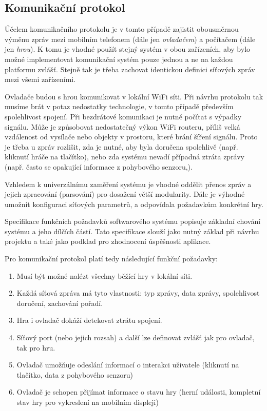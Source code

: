 \documentclass[thesis=B,czech,hidelinks]{FITthesis}[2012/06/26] %
\begin{document}
\subsection{Komunikační protokol}

Účelem komunikačního protokolu je v tomto případě zajistit obousměrnou výměnu zpráv mezi mobilním telefonem (dále jen \textit{ovladačem}) a počítačem (dále jen \textit{hrou}). K tomu je vhodné použít stejný systém v obou zařízeních, aby bylo možné implementovat komunikační systém pouze jednou a ne na každou platformu zvlášť. Stejně tak je třeba zachovat identickou definici síťových zpráv mezi všemi zařízeními.

Ovladače budou s hrou komunikovat v lokální WiFi síti. Při návrhu protokolu tak musíme brát v potaz nedostatky technologie, v tomto případě především spolehlivost spojení. Při bezdrátové komunikaci je nutné počítat s výpadky signálu. Může je způsobovat nedostatečný výkon WiFi routeru, příliš velká vzdálenost od vysílače nebo objekty v prostoru, které brání šíření signálu. Proto je třeba u zpráv rozlišit, zda je nutné, aby byla doručena spolehlivě (např. kliknutí hráče na tlačítko), nebo zda systému nevadí případná ztráta zprávy (např. často se opakující informace z pohybového senzoru,). 

Vzhledem k univerzálnímu zaměření systému je vhodné oddělit přenos zpráv a jejich zpracování (parsování) pro dosažení větší modularity. Dále je výhodné umožnit  konfiguraci síťových parametrů, a odpovídala požadavkům konkrétní hry.

Specifikace funkčních požadavků softwarového systému popisuje základní chování systému a jeho dílčích částí. Tato specifikace slouží jako nutný základ při návrhu projektu a také jako podklad pro zhodnocení úspěšnosti aplikace. \cite{pozadavky}

Pro komunikační protokol platí tedy následující funkční požadavky:

\begin{enumerate}
	\item Musí být možné nalézt všechny běžící hry v lokální síti.
	\item Každá síťová zpráva má tyto vlastnosti: typ zprávy, data zprávy, spolehlivost doručení, zachování pořadí.
	\item Hra i ovladač dokáží detekovat ztrátu spojení.
	\item Síťový port (nebo jejich rozsah) a další lze definovat zvlášť jak pro ovladač, tak pro hru.
	\item Ovladač umožňuje odeslání informací o interakci uživatele (kliknutí na tlačítko, data z pohybového senzoru)
	\item Ovladač je schopen přijímat informace o stavu hry (herní události, kompletní stav hry pro vykreslení na mobilním displeji)
\end{enumerate}
\end{document}

